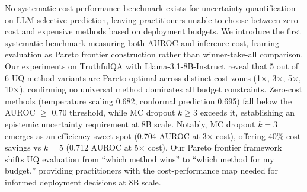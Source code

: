 No systematic cost-performance benchmark exists for uncertainty quantification on LLM selective prediction, leaving practitioners unable to choose between zero-cost and expensive methods based on deployment budgets. We introduce the first systematic benchmark measuring both AUROC and inference cost, framing evaluation as Pareto frontier construction rather than winner-take-all comparison. Our experiments on TruthfulQA with Llama-3.1-8B-Instruct reveal that 5 out of 6 UQ method variants are Pareto-optimal across distinct cost zones (1$\times$, 3$\times$, 5$\times$, 10$\times$), confirming no universal method dominates all budget constraints. Zero-cost methods (temperature scaling 0.682, conformal prediction 0.695) fall below the AUROC $\geq$ 0.70 threshold, while MC dropout $k\geq3$ exceeds it, establishing an epistemic uncertainty requirement at 8B scale. Notably, MC dropout $k=3$ emerges as an efficiency sweet spot (0.704 AUROC at 3$\times$ cost), offering 40\% cost savings vs $k=5$ (0.712 AUROC at 5$\times$ cost). Our Pareto frontier framework shifts UQ evaluation from ``which method wins'' to ``which method for my budget,'' providing practitioners with the cost-performance map needed for informed deployment decisions at 8B scale.
